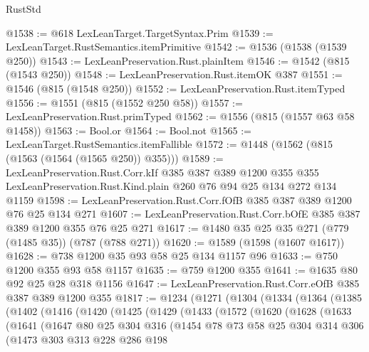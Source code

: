 \begin{lexlean}{RustStd}
\begin{coremodule}
@1538 := @618 LexLeanTarget.TargetSyntax.Prim
@1539 := LexLeanTarget.RustSemantics.itemPrimitive
@1542 := @1536 (@1538 (@1539 @250))
@1543 := LexLeanPreservation.Rust.plainItem
@1546 := @1542 (@815 (@1543 @250))
@1548 := LexLeanPreservation.Rust.itemOK @387
@1551 := @1546 (@815 (@1548 @250))
@1552 := LexLeanPreservation.Rust.itemTyped
@1556 := @1551 (@815 (@1552 @250 @58))
@1557 := LexLeanPreservation.Rust.primTyped
@1562 := @1556 (@815 (@1557 @63 @58 @1458))
@1563 := Bool.or
@1564 := Bool.not
@1565 := LexLeanTarget.RustSemantics.itemFallible
@1572 := @1448 (@1562 (@815 (@1563 (@1564 (@1565 @250)) @355)))
@1589 := LexLeanPreservation.Rust.Corr.kIf
    @385
    @387
    @389
    @1200
    @355
    @355
    LexLeanPreservation.Rust.Kind.plain
    @260
    @76
    @94
    @25
    @134
    @272
    @134
    @1159
@1598 := LexLeanPreservation.Rust.Corr.fOfB @385 @387 @389 @1200 @76 @25 @134 @271
@1607 := LexLeanPreservation.Rust.Corr.bOfE @385 @387 @389 @1200 @355 @76 @25 @271
@1617 := @1480 @35 @25 @35 @271 (@779 (@1485 @35)) (@787 (@788 @271))
@1620 := @1589 (@1598 (@1607 @1617))
@1628 := @738 @1200 @35 @93 @58 @25 @134 @1157 @96
@1633 := @750 @1200 @355 @93 @58 @1157
@1635 := @759 @1200 @355
@1641 := @1635 @80 @92 @25 @28 @318 @1156
@1647 := LexLeanPreservation.Rust.Corr.eOfB @385 @387 @389 @1200 @355
@1817 := @1234
    (@1271
      (@1304
        (@1334
          (@1364
            (@1385
              (@1402
                (@1416
                  (@1420
                    (@1425
                      (@1429
                        (@1433
                          (@1572
                            (@1620
                              (@1628
                                (@1633
                                  (@1641
                                    (@1647
                                      @80
                                      @25
                                      @304
                                      @316
                                      (@1454
                                        @78
                                        @73
                                        @58
                                        @25
                                        @304
                                        @314
                                        @306
                                        (@1473
                                          @303
                                          @313
                                          @228
                                          @286
                                          @198

\end{coremodule}
\end{lexlean}
